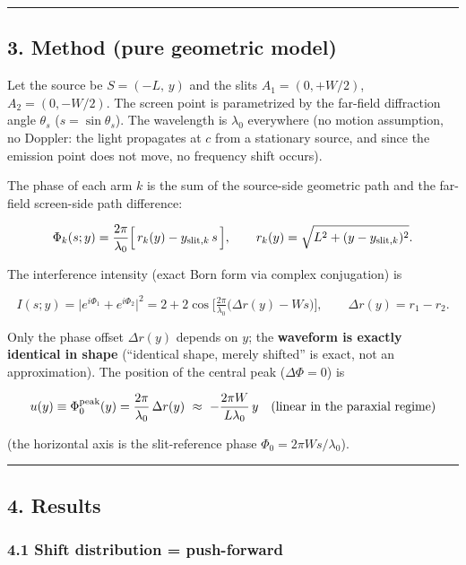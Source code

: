 \documentclass[
]{article}
\begin{document}
\begin{center}\rule{0.5\linewidth}{0.5pt}\end{center}

\subsection{3. Method (pure geometric
model)}\label{method-pure-geometric-model}

Let the source be \(S=(-L,\,y)\) and the slits \(A_1=(0,+W/2)\),
\(A_2=(0,-W/2)\). The screen point is parametrized by the far-field
diffraction angle \(\theta_s\) (\(s=\sin\theta_s\)). The wavelength is
\(\lambda_0\) everywhere (no motion assumption, no Doppler: the light
propagates at \(c\) from a stationary source, and since the emission
point does not move, no frequency shift occurs).

The phase of each arm \(k\) is the sum of the source-side geometric path
and the far-field screen-side path difference:

\[\Phi_k(s;y)=\frac{2\pi}{\lambda_0}\Big[\,r_k(y)-y_{{\rm slit},k}\,s\,\Big],\qquad
r_k(y)=\sqrt{L^2+(y-y_{{\rm slit},k})^2}.\]

The interference intensity (exact Born form via complex conjugation) is

\[I(s;y)=\big|e^{i\Phi_1}+e^{i\Phi_2}\big|^2
=2+2\cos\!\Big[\tfrac{2\pi}{\lambda_0}\big(\Delta r(y)-W s\big)\Big],\qquad \Delta r(y)=r_1-r_2.\]

Only the phase offset \(\Delta r(y)\) depends on \(y\); the
\textbf{waveform is exactly identical in shape} (``identical shape,
merely shifted'' is exact, not an approximation). The position of the
central peak (\(\Delta\Phi=0\)) is

\[u(y)\equiv\Phi_0^{\rm peak}(y)=\frac{2\pi}{\lambda_0}\,\Delta r(y)\ \approx\ -\frac{2\pi W}{L\lambda_0}\,y\quad(\text{linear in the paraxial regime})\]

(the horizontal axis is the slit-reference phase
\(\Phi_0=2\pi W s/\lambda_0\)).

\begin{center}\rule{0.5\linewidth}{0.5pt}\end{center}

\subsection{4. Results}\label{results}

\subsubsection{4.1 Shift distribution =
push-forward}\label{shift-distribution-push-forward}
\end{document}
